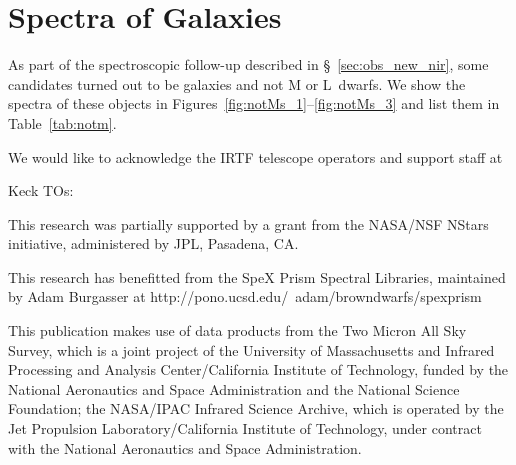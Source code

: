 \documentclass[12pt,preprint]{aastex}
\begin{document}
% 


\appendix
\section{Spectra of Galaxies}
\label{sec:galaxies}
As part of the spectroscopic follow-up described in \S~\ref{sec:obs_new_nir}, some candidates turned out to be galaxies and not M or L~dwarfs. We show the spectra of these objects in Figures~\ref{fig:notMs_1}--\ref{fig:notMs_3} and list them in Table~\ref{tab:notm}.

\acknowledgments
We would like to acknowledge the IRTF telescope operators
and support staff at 

Keck TOs:

This research was partially supported by a grant from the NASA/NSF NStars initiative, administered by JPL, Pasadena, CA.  

This research has benefitted from the SpeX Prism Spectral Libraries, maintained by Adam Burgasser at http://pono.ucsd.edu/~adam/browndwarfs/spexprism

This publication makes use of data products from the Two Micron All Sky Survey, which is a joint project of the University of Massachusetts and Infrared Processing and Analysis Center/California Institute of Technology, funded by the National Aeronautics and Space Administration and the National Science Foundation; the NASA/IPAC Infrared Science Archive, which is operated by the Jet Propulsion Laboratory/California Institute of Technology, under contract with the National Aeronautics and Space Administration.  
\end{document}
